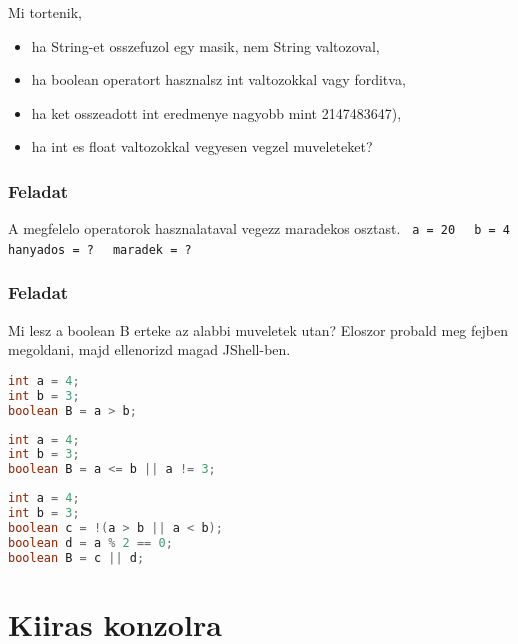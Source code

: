 \documentclass{article}
\begin{document}
Mi tortenik,
\begin{itemize}
    \item ha String-et osszefuzol egy masik, nem String valtozoval,
    \item ha boolean operatort hasznalsz int valtozokkal vagy forditva,
    \item ha ket osszeadott int eredmenye nagyobb mint 2147483647),
    \item ha int es float valtozokkal vegyesen vegzel muveleteket?
\end{itemize}

\subsubsection{Feladat}

A megfelelo operatorok hasznalataval vegezz maradekos osztast.\newline
\lstinline[mathescape]{ a = 20 }\newline
\lstinline[mathescape]{ b = 4 }\newline
\lstinline[mathescape]{ hanyados = ? }\newline
\lstinline[mathescape]{ maradek = ? }\newline

\subsubsection{Feladat}

Mi lesz a boolean B erteke az alabbi muveletek utan? Eloszor probald meg fejben megoldani, majd ellenorizd magad JShell-ben.

\begin{lstlisting}[language=Java, caption=Muvelet 1.]
int a = 4;
int b = 3;
boolean B = a > b;
\end{lstlisting}

\begin{lstlisting}[language=Java, caption=Muvelet 2.]
int a = 4;
int b = 3;
boolean B = a <= b || a != 3;
\end{lstlisting}

\begin{lstlisting}[language=Java, caption=Muvelet 3.]
int a = 4;
int b = 3;
boolean c = !(a > b || a < b);
boolean d = a % 2 == 0;
boolean B = c || d;
\end{lstlisting}

\newpage

\section{Kiiras konzolra}
\end{document}
